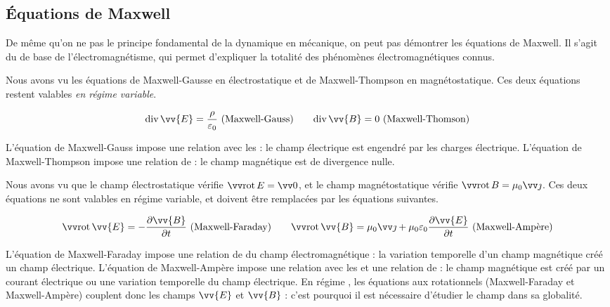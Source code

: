 \documentclass[12pt,fancy]{cours}
\begin{document}
\subsection{Équations de Maxwell}
De même qu'on ne  pas le principe fondamental de la dynamique en mécanique, on peut pas démontrer les équations de Maxwell. Il s'agit du  de base de l'électromagnétisme, qui permet d'expliquer la totalité des phénomènes électromagnétiques connus.

 Nous avons vu les équations de Maxwell-Gausse en électrostatique et de Maxwell-Thompson en magnétostatique. Ces deux équations restent valables \emph{en régime variable}.

\begin{theorem}\label{form:}
\begin{equation*}
\dive{\vv{E}}=\frac{\rho}{\varepsilon_0}~(\text{Maxwell-Gauss})\qquad
\dive{\vv{B}}=0~(\text{Maxwell-Thomson})
\end{equation*}
\end{theorem}
L’équation de Maxwell-Gauss impose une relation avec les  : le champ électrique est engendré par les charges électrique. L’équation de Maxwell-Thompson impose une relation de  : le champ magnétique est de divergence nulle.

Nous avons vu que le champ électrostatique vérifie $\Rot{E} = \Vec{0}$, et le champ magnétostatique vérifie $\Rot{B} = \mu_0 \j$. Ces deux équations ne sont  valables en régime variable, et doivent être remplacées par les équations suivantes.
\begin{theorem}\label{form:}
\begin{equation*}
\rot{\vv{E}}=-\frac{\partial \vv{B}}{\partial t}~(\text{Maxwell-Faraday})\qquad
\rot{\vv{B}}=\mu_0\j+\mu_0\varepsilon_0\frac{\partial \vv{E}}{\partial t}~(\text{Maxwell-Ampère})
\end{equation*}
\end{theorem}
\noindent
L’équation de Maxwell-Faraday impose une relation de  du champ électromagnétique : la variation temporelle d’un champ magnétique créé un champ électrique. L’équation de Maxwell-Ampère impose une relation avec les  et une relation de  : le champ magnétique est créé par un courant électrique ou une variation temporelle du champ électrique.  En régime , les équations aux rotationnels (Maxwell-Faraday et Maxwell-Ampère) couplent donc les champs $\vv{E}$ et $\vv{B}$ : c’est pourquoi il est nécessaire d’étudier le champ  dans sa globalité.
\end{document}
